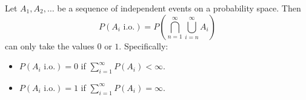 Let $A_1, A_2, \ldots$ be a sequence of independent events on a probability space. Then
$$P(A_i \text{ i.o.}) = P\left(\bigcap_{n=1}^{\infty} \bigcup_{i=n}^{\infty} A_i\right)$$
can only take the values $0$ or $1$. Specifically:
\begin{itemize}
\item $P(A_i \text{ i.o.}) = 0$ if $\sum_{i=1}^{\infty} P(A_i) < \infty$.
\item $P(A_i \text{ i.o.}) = 1$ if $\sum_{i=1}^{\infty} P(A_i) = \infty$.
\end{itemize}
